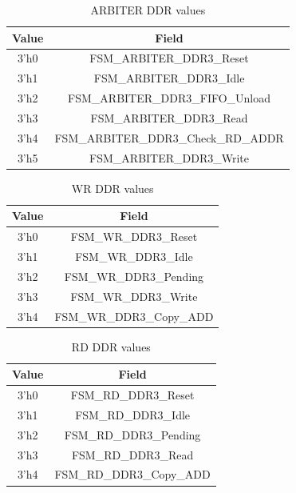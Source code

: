\begin{table}
\caption{\label{ARBITER} ARBITER DDR values}
\begin{center}
\begin{tabular}{|c|c|}
\hline
Value				& Field 	\\	
\hline
3'h0				& FSM\_ARBITER\_DDR3\_Reset \\
\hline
3'h1				& FSM\_ARBITER\_DDR3\_Idle \\
\hline
3'h2				& FSM\_ARBITER\_DDR3\_FIFO\_Unload \\
\hline
3'h3				& FSM\_ARBITER\_DDR3\_Read \\
\hline
3'h4				& FSM\_ARBITER\_DDR3\_Check\_RD\_ADDR \\
\hline
3'h5				& FSM\_ARBITER\_DDR3\_Write \\
\hline
\end{tabular}
\end{center}
\end{table}



\begin{table}
\caption{\label{WR_DDR} WR DDR values}
\begin{center}
\begin{tabular}{|c|c|}
\hline
Value				& Field 	\\	
\hline
3'h0				& FSM\_WR\_DDR3\_Reset \\
\hline
3'h1				& FSM\_WR\_DDR3\_Idle \\
\hline
3'h2				& FSM\_WR\_DDR3\_Pending \\
\hline
3'h3				& FSM\_WR\_DDR3\_Write \\
\hline
3'h4				& FSM\_WR\_DDR3\_Copy\_ADD \\
\hline
\end{tabular}
\end{center}
\end{table}


\begin{table}
\caption{\label{RD_DDR} RD DDR values }
\begin{center}
\begin{tabular}{|c|c|}
\hline
Value				& Field 	\\	
\hline
3'h0				& FSM\_RD\_DDR3\_Reset \\
\hline
3'h1				& FSM\_RD\_DDR3\_Idle \\
\hline
3'h2				& FSM\_RD\_DDR3\_Pending \\
\hline
3'h3				& FSM\_RD\_DDR3\_Read \\
\hline
3'h4				& FSM\_RD\_DDR3\_Copy\_ADD \\
\hline
\end{tabular}
\end{center}
\end{table}






